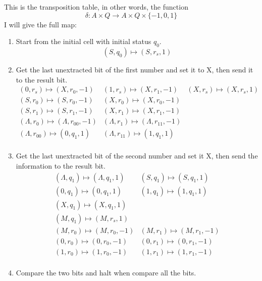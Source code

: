 \documentclass[a4papper]{article}
\theoremstyle{neosn}
\begin{document}
    This is the transposition table, in other words, the function
    \[
        \delta: A \times Q \to A \times Q \times \{-1, 0, 1\}
    \]
    I will give the full map:
    \begin{enumerate}
        \item Start from the initial cell with initial status $q_0$.
        \[
            (S, q_0) \mapsto (S, r_s, 1)
        \]
        \item Get the last unextracted bit of the first number and set it to X, then
        send it to the result bit.
        \[
            \begin{array}{lll}
            (0, r_s) \mapsto (X, r_0, -1) & (1, r_s) \mapsto (X, r_1, -1) & (X, r_s) \mapsto (X, r_s, 1) \\
            (S, r_0) \mapsto (S, r_0, -1) & (X, r_0) \mapsto (X, r_0, -1) &  \\
            (S, r_1) \mapsto (S, r_1, -1) & (X, r_1) \mapsto (X, r_1, -1) & \\
            (\Lambda, r_0) \mapsto (\Lambda, r_{00}, -1) & (\Lambda, r_1) \mapsto (\Lambda, r_{11}, -1) & \\
            (\Lambda, r_{00}) \mapsto (0, q_1, 1) & (\Lambda, r_{11}) \mapsto (1, q_1, 1) & \\
            \end{array}
        \]
        \item Get the last unextracted bit of the second number and set it X,
        then send the information to the result bit.
        \[
            \begin{array}{ll}
            (\Lambda, q_1) \mapsto (\Lambda, q_1, 1) & (S, q_1) \mapsto (S, q_1, 1) \\
            (0, q_1) \mapsto (0, q_1, 1) & (1, q_1) \mapsto (1, q_1, 1) \\
            (X, q_1) \mapsto (X, q_1, 1) & \\
            (M, q_1) \mapsto (M, r_s, 1) & \\
            (M, r_0) \mapsto (M, r_0, -1) & (M, r_1) \mapsto (M, r_1, -1) \\
            (0, r_0) \mapsto (0, r_0, -1) & (0, r_1) \mapsto (0, r_1, -1) \\
            (1, r_0) \mapsto (1, r_0, -1) & (1, r_1) \mapsto (1, r_1, -1) \\
            \end{array}
        \]
        \item Compare the two bits and halt when compare all the bits.
        \[
\]
\end{enumerate}
\end{document}
